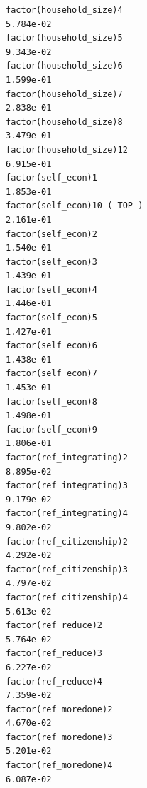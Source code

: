 \documentclass[
]{article}
\begin{document}
\begin{table}
\begin{minipage}[t]{\linewidth}
{\begin{verbatim}
factor(household_size)4                                                            5.784e-02
factor(household_size)5                                                            9.343e-02
factor(household_size)6                                                            1.599e-01
factor(household_size)7                                                            2.838e-01
factor(household_size)8                                                            3.479e-01
factor(household_size)12                                                           6.915e-01
factor(self_econ)1                                                                 1.853e-01
factor(self_econ)10 ( TOP )                                                        2.161e-01
factor(self_econ)2                                                                 1.540e-01
factor(self_econ)3                                                                 1.439e-01
factor(self_econ)4                                                                 1.446e-01
factor(self_econ)5                                                                 1.427e-01
factor(self_econ)6                                                                 1.438e-01
factor(self_econ)7                                                                 1.453e-01
factor(self_econ)8                                                                 1.498e-01
factor(self_econ)9                                                                 1.806e-01
factor(ref_integrating)2                                                           8.895e-02
factor(ref_integrating)3                                                           9.179e-02
factor(ref_integrating)4                                                           9.802e-02
factor(ref_citizenship)2                                                           4.292e-02
factor(ref_citizenship)3                                                           4.797e-02
factor(ref_citizenship)4                                                           5.613e-02
factor(ref_reduce)2                                                                5.764e-02
factor(ref_reduce)3                                                                6.227e-02
factor(ref_reduce)4                                                                7.359e-02
factor(ref_moredone)2                                                              4.670e-02
factor(ref_moredone)3                                                              5.201e-02
factor(ref_moredone)4                                                              6.087e-02

\end{verbatim}}
\end{minipage}
\end{table}
\end{document}
